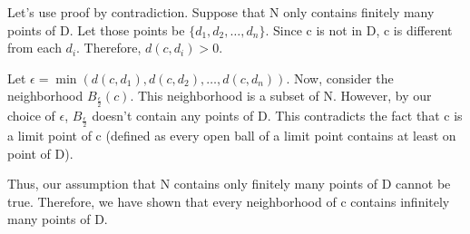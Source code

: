 \documentclass[12]{amsart}
\theoremstyle{definition}
\newcommand{\lskip}{\newpage}
\begin{document}
Let's use proof by contradiction. Suppose that N only contains finitely many
points of D. Let those points be $\{d_1, d_2, \dots, d_n\}$. Since c is not in D,
c is different from each $d_i$. Therefore, $d(c, d_i) > 0$.

Let $\epsilon = \min(d(c, d_1), d(c, d_2), \dots, d(c, d_n))$. Now, consider the
neighborhood $B_{\frac{\epsilon}{2}}(c)$. This neighborhood is a subset of N.
However, by our choice of $\epsilon$, $B_{\frac{\epsilon}{2}}$ doesn't contain any
points of D. This contradicts the fact that c is a limit point of c
(defined as every open ball of a limit point contains at least on point of D).

Thus, our assumption that N contains only finitely many points of D cannot be true.
Therefore, we have shown that every neighborhood of c contains infinitely
many points of D.


\lskip
\end{document}
